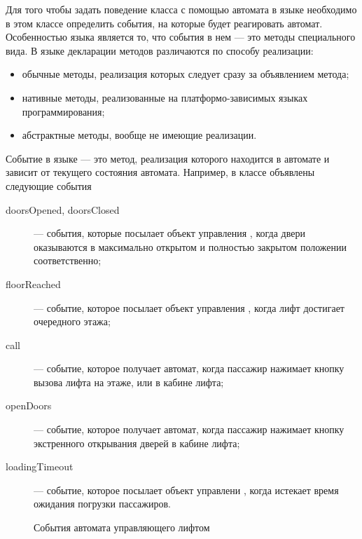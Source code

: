 Для того чтобы задать поведение класса с помощью автомата в языке  необходимо в этом классе определить события, на которые будет реагировать автомат. Особенностью языка  является то, что события в нем --- это методы специального вида. В языке  декларации методов различаются по способу реализации:
\begin{itemize}
 \item обычные методы, реализация которых следует сразу за объявлением метода;
 \item нативные методы, реализованные на платформо-зависимых языках программирования;
 \item абстрактные методы, вообще не имеющие реализации.
\end{itemize}
Событие в языке  --- это метод, реализация которого находится в автомате и зависит от текущего состояния автомата. Например, в классе  объявлены следующие события \pic{\ref{fig:ElevatorEvents}}
\begin{description}
 \item[doorsOpened, doorsClosed] --- события, которые посылает объект управления , когда двери оказываются в максимально открытом и полностью закрытом положении соответственно;
 \item[floorReached] --- событие, которое посылает объект управления , когда лифт достигает очередного этажа;
 \item[call] --- событие, которое получает автомат, когда пассажир нажимает кнопку вызова лифта на этаже, или в кабине лифта;
 \item[openDoors] --- событие, которое получает автомат, когда пассажир нажимает кнопку экстренного открывания дверей в кабине лифта;
 \item[loadingTimeout] --- событие, которое посылает объект управлени , когда истекает время ожидания погрузки пассажиров.
\end{description}
\begin{figure}
 \centering
 \caption{События автомата управляющего лифтом}
 \label{fig:ElevatorEvents}
\end{figure}
